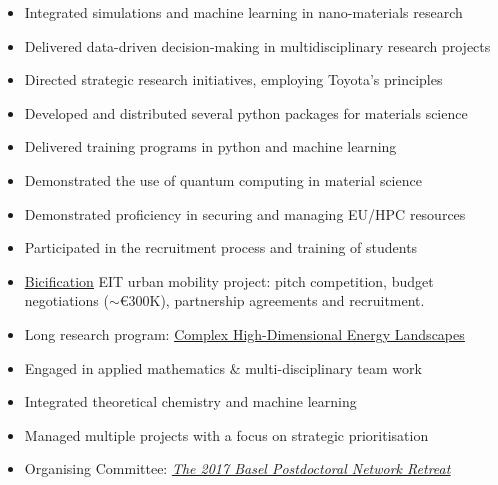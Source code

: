 \documentclass[10pt,a4paper,ragged2e,withhyper]{altacv}
\begin{document}
\begin{paracol}{2}
\begin{itemize}
\item Integrated simulations and machine learning in nano-materials research
\item Delivered data-driven decision-making in multidisciplinary research projects
\item Directed strategic research initiatives, employing Toyota’s principles 
\item Developed and distributed  several python packages for materials science
\item Delivered training programs in python and machine learning
\item Demonstrated the use of quantum computing in material science
\item Demonstrated proficiency in securing and managing EU/HPC resources
\item Participated in the recruitment process and training of students
\end{itemize}
\divider

\begin{itemize}
\item \href{https://bicification-project.eu/}{\underline{Bicification}} EIT urban mobility project: pitch competition, budget negotiations ($\sim$\euro{300K}), partnership agreements and recruitment.
\end{itemize}
\divider

\begin{itemize}
\item Long research program: \href{https://www.ipam.ucla.edu/programs/long-programs/complex-high-dimensional-energy-landscapes/}{\underline{Complex High-Dimensional Energy Landscapes}}
\item Engaged in applied mathematics \& multi-disciplinary team work
\end{itemize}
\divider

\begin{itemize}
\item Integrated theoretical chemistry and machine learning%
\item Managed multiple projects with a focus on strategic prioritisation%
\item Organising Committee: \href{https://postdocretreat.biozentrum.unibas.ch/?page_id=1677}{\underline{\emph{The 2017 Basel Postdoctoral Network Retreat}}}
\end{itemize}
\divider


\end{paracol}
\end{document}

